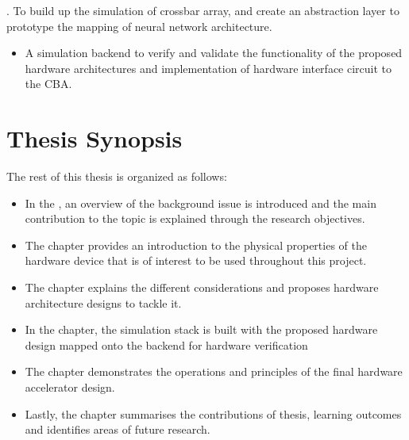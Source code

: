 . To build up the simulation of crossbar array, and create an abstraction layer to prototype the mapping of neural network architecture.
  \begin{itemize}
    \item A simulation backend to verify and validate the functionality of the proposed hardware architectures and implementation of hardware interface circuit to the \ac{CBA}.
  \end{itemize}

\section{Thesis Synopsis}

\noindent
The rest of this thesis is organized as follows:

\begin{itemize}
  \item
  In the , an overview of the background issue is introduced and the main contribution to the topic is explained through the research objectives.
  \item
  The  chapter provides an introduction to the physical properties of the hardware device that is of interest to be used throughout this project.
  \item
  The  chapter explains the different considerations and proposes hardware architecture designs to tackle it.
  \item
  In the  chapter, the simulation stack is built with the proposed hardware design mapped onto the backend for hardware verification
  \item
  The  chapter demonstrates the operations and principles of the final hardware accelerator design.
  \item
  Lastly, the  chapter summarises the contributions of thesis, learning outcomes and identifies areas of future research.
\end{itemize}